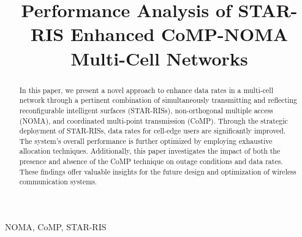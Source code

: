 \documentclass[conference]{IEEEtran}
\begin{document}
\title{Performance Analysis of STAR-RIS Enhanced CoMP-NOMA Multi-Cell Networks}

\author{
}
\maketitle

\begin{abstract}
In this paper, we present a novel approach to enhance data rates in a multi-cell network through a pertinent combination of simultaneously transmitting and reflecting reconfigurable intelligent surfaces (STAR-RISs), non-orthogonal multiple access (NOMA), and coordinated multi-point transmission (CoMP). Through the strategic deployment of STAR-RISs, data rates for cell-edge users are significantly improved. The system's overall performance is further optimized by employing exhaustive allocation techniques. Additionally, this paper investigates the impact of both the presence and absence of the CoMP technique on outage conditions and data rates. These findings offer valuable insights for the future design and optimization of wireless communication systems.
\end{abstract}

\begin{IEEEkeywords}
	NOMA, CoMP, STAR-RIS
\end{IEEEkeywords}
\end{document}

